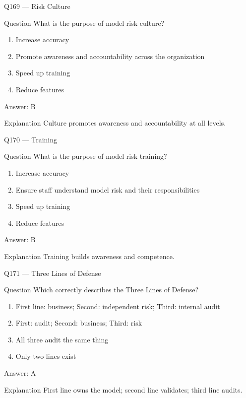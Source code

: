 \documentclass[aspectratio=169,8pt]{beamer}
\begin{document}
	\begin{frame}{Q169 --- Risk Culture}
		\begin{block}{Question}
			What is the purpose of model risk culture?
		\end{block}
		\begin{enumerate}
			\item Increase accuracy
			\item Promote awareness and accountability across the organization
			\item Speed up training
			\item Reduce features
		\end{enumerate}
		\begin{exampleblock}{Answer: B}\end{exampleblock}
		\begin{block}{Explanation}
			Culture promotes awareness and accountability at all levels.
		\end{block}
	\end{frame}
	
	\begin{frame}{Q170 --- Training}
		\begin{block}{Question}
			What is the purpose of model risk training?
		\end{block}
		\begin{enumerate}
			\item Increase accuracy
			\item Ensure staff understand model risk and their responsibilities
			\item Speed up training
			\item Reduce features
		\end{enumerate}
		\begin{exampleblock}{Answer: B}\end{exampleblock}
		\begin{block}{Explanation}
			Training builds awareness and competence.
		\end{block}
	\end{frame}
	
	\begin{frame}{Q171 --- Three Lines of Defense}
		\begin{block}{Question}
			Which correctly describes the Three Lines of Defense?
		\end{block}
		\begin{enumerate}
			\item First line: business; Second: independent risk; Third: internal audit
			\item First: audit; Second: business; Third: risk
			\item All three audit the same thing
			\item Only two lines exist
		\end{enumerate}
		\begin{exampleblock}{Answer: A}\end{exampleblock}
		\begin{block}{Explanation}
			First line owns the model; second line validates; third line audits.
		\end{block}
	\end{frame}
	
\end{document}
